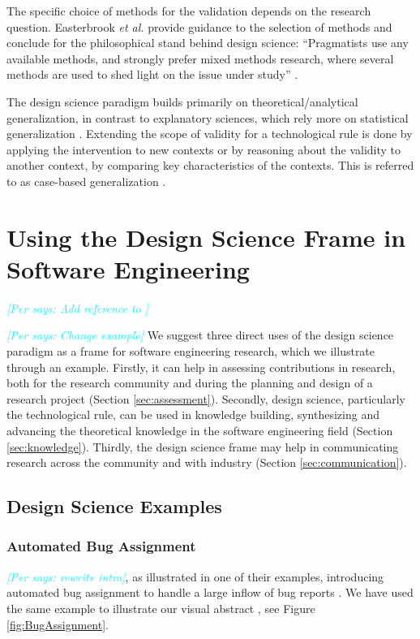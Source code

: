\documentclass[graybox]{svmult}
\newcommand{\per}[1]{\textcolor{cyan}{{\it [Per says: #1]}}}
\newcommand{\per}[1]{}
\begin{document}
The specific choice of methods for the validation depends on the research question. Easterbrook \emph{et al.} provide guidance to the selection of methods and conclude for the philosophical stand behind design science: ``Pragmatists use any available methods, and strongly prefer mixed methods research, where several methods are used to shed light on the issue under study'' \cite{easterbrook_selecting_2008}.

The design science paradigm builds primarily on theoretical/analytical generalization, in contrast to explanatory sciences, which rely more on statistical generalization \cite[p. 30]{Runeson12Case}. Extending the scope of validity for a technological rule is done by applying the intervention to new contexts or by reasoning about the validity to another context, by comparing key characteristics of the contexts. This is referred to as case-based generalization \cite{Wieringa2015}. 


\section{Using the Design Science Frame in Software Engineering}
\per{Add reference to \cite{Engstrom19arxiv} }

\per {Change example}
We suggest three direct uses of the design science paradigm as a frame for software engineering research, which we illustrate through an example. Firstly, it can help in assessing contributions in research, both for the research community and during the planning and design of a research project (Section \ref{sec:assessment}). Secondly, design science, particularly the technological rule, can be used in knowledge building, synthesizing and advancing the theoretical knowledge in the software engineering field (Section \ref{sec:knowledge}). Thirdly, the design science frame may help in communicating research across the community and with industry (Section \ref{sec:communication}).

\subsection{Design Science Examples}
\subsubsection{Automated Bug Assignment}
\per{rewrite intro}, as illustrated in one of their examples, introducing automated bug assignment to handle a large inflow of bug reports \cite{JonssonBug15}. We have used the same example to illustrate our visual abstract \cite{StoreyESEM17}, see Figure \ref{fig:BugAssignment}.
\end{document}
